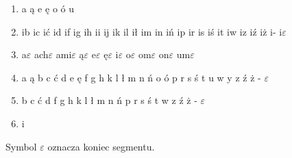 \documentclass{article}
\begin{document}
\begin{enumerate}
\item a ą e ę o ó u
\item ib ic ić id if ig ih ii ij ik il ił im in iń ip ir is iś it iw iz iź iż i- i$\varepsilon$
\item a$\varepsilon$ ach$\varepsilon$ ami$\varepsilon$ ą$\varepsilon$ e$\varepsilon$ ę$\varepsilon$ i$\varepsilon$ o$\varepsilon$ om$\varepsilon$ on$\varepsilon$ um$\varepsilon$
\item a ą b c ć d e ę f g h k l ł m n ń o ó p r s ś t u w y z ź ż - $\varepsilon$
\item b c ć d f g h k l ł m n ń p r s ś t w z ź ż - $\varepsilon$
\item i
\end{enumerate}

Symbol $\varepsilon$ oznacza koniec segmentu.
\end{document}
